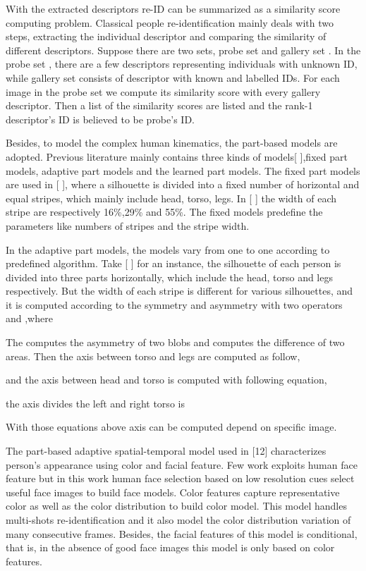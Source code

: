 With the extracted descriptors re-ID can be summarized as a similarity score computing problem. Classical people re-identification mainly deals with two steps, extracting the individual descriptor and comparing the similarity of different descriptors. Suppose there are two sets, probe set  and gallery set . In the probe set , there are a few descriptors representing individuals with unknown ID, while gallery set  consists of descriptor with known and labelled IDs. For each image in the probe set we compute its similarity score with every gallery descriptor. Then a list of the similarity scores are listed and the rank-1 descriptor's ID is believed to be probe's ID.


Besides, to model the complex human kinematics, the part-based models are adopted. Previous literature mainly contains three kinds of models[ ],fixed part models, adaptive part  models and the learned part models. The fixed part models are used in [  ], where a silhouette is divided into a fixed number of horizontal and equal stripes, which mainly include head, torso, legs. In [ ] the width of each stripe are respectively 16\%,29\% and 55\%.  The fixed models predefine the parameters like numbers of stripes and the stripe width.

In the adaptive part models, the models vary from one to one according to predefined algorithm. Take [ ] for an instance, the silhouette of each person is divided into three parts horizontally, which include the head, torso and legs respectively. But the width of each stripe is different for various silhouettes, and it is computed according to the symmetry and asymmetry with two operators  and ,where


The  computes the asymmetry of two blobs and  computes the difference of two areas. Then the axis between torso and legs are computed as follow,

and the axis between head and torso is computed with following equation,

the axis divides the left and right torso is 

With those equations above axis can be computed depend on specific image.

The part-based adaptive spatial-temporal model used in [12] characterizes person's appearance using color and facial feature. Few work exploits human face feature but in this work human face selection based on low resolution cues select useful face images to build face models. Color features capture representative color as well as the color distribution to build color model. This model handles multi-shots re-identification and it also model the color distribution variation of many consecutive frames.  Besides, the facial features of this model is conditional, that is, in the absence of good face images this model is only based on color features.

